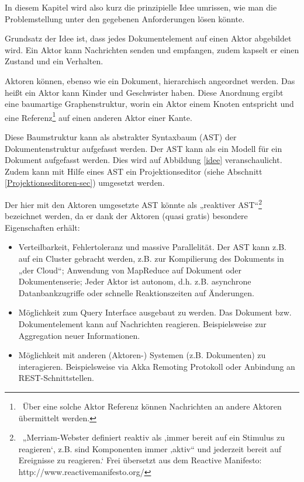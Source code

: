 
In diesem Kapitel wird also kurz die prinzipielle Idee umrissen, wie man die Problemstellung unter den gegebenen Anforderungen lösen könnte.

 
Grundsatz der Idee ist, dass jedes Dokumentelement auf einen Aktor abgebildet wird. Ein Aktor kann Nachrichten senden und empfangen, zudem kapselt er einen Zustand und ein Verhalten.

 
Aktoren können, ebenso wie ein Dokument, hierarchisch angeordnet werden. Das heißt ein Aktor kann Kinder und Geschwister haben. Diese Anordnung ergibt eine baumartige Graphenstruktur, worin ein Aktor einem Knoten entspricht und eine Referenz\footnote{~Über eine solche Aktor Referenz können Nachrichten an andere Aktoren übermittelt werden.} auf einen anderen Aktor einer Kante.

 
Diese Baumstruktur kann als abstrakter Syntaxbaum (AST) der Dokumentenstruktur aufgefasst werden. Der AST kann als ein Modell für ein Dokument aufgefasst werden. Dies wird auf Abbildung \ref{idee} veranschaulicht. Zudem kann mit Hilfe eines AST ein Projektionseditor (siehe Abschnitt \ref{Projektionseditoren-sec}) umgesetzt werden.

 
Der hier mit den Aktoren umgesetzte AST könnte als „reaktiver AST“\footnote{~„Merriam-Webster definiert reaktiv als ‚immer bereit auf ein Stimulus zu reagieren‘, z.B. sind Komponenten immer ‚aktiv“ und jederzeit bereit auf Ereignisse zu reagieren.‘ Frei übersetzt aus dem Reactive Manifesto: http://www.reactivemanifesto.org/} bezeichnet werden, da er dank der Aktoren (quasi gratis) besondere Eigenschaften erhält:

 
\begin{itemize}

\item Verteilbarkeit, Fehlertoleranz und massive Parallelität. Der AST kann z.B. auf ein Cluster gebracht werden, z.B. zur Kompilierung des Dokuments in „der Cloud“; Anwendung von MapReduce auf Dokument oder Dokumentenserie; Jeder Aktor ist autonom, d.h. z.B. asynchrone Datanbankzugriffe oder schnelle Reaktionszeiten auf Änderungen.
\item Möglichkeit zum Query Interface ausgebaut zu werden. Das Dokument bzw. Dokumentelement kann auf Nachrichten reagieren. Beispielsweise zur Aggregation neuer Informationen.
\item Möglichkeit mit anderen (Aktoren-) Systemen (z.B. Dokumenten) zu interagieren. Beispielsweise via Akka Remoting Protokoll oder Anbindung an REST-Schnittstellen.
\end{itemize}
 
